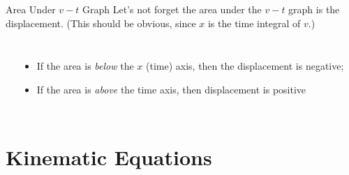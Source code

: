 \documentclass[12pt,compress,aspectratio=169]{beamer}
\begin{document}
\begin{frame}{Area Under $v-t$ Graph}
  Let's not forget the area under the $v-t$ graph is the displacement. (This
  should be obvious, since $x$ is the time integral of $v$.)
  \begin{columns}
    \begin{center}
    \end{center}
    
    \begin{itemize}
    \item If the area is \textcolor{red!40}{\emph{below}} the $x$ (time) axis,
      then the displacement is negative;
    \item If the area is \textcolor{blue!20}{\emph{above}} the time axis, then
      displacement is positive
    \end{itemize}
  \end{columns}
\end{frame}


\section{Kinematic Equations}
\end{document}
